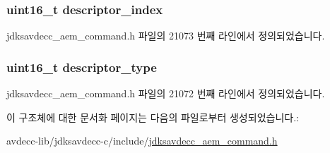 \subsubsection[{\texorpdfstring{descriptor\+\_\+index}{descriptor_index}}]{\setlength{\rightskip}{0pt plus 5cm}uint16\+\_\+t descriptor\+\_\+index}\hypertarget{structjdksavdecc__aem__command__get__mixer__response_a042bbc76d835b82d27c1932431ee38d4}{}\label{structjdksavdecc__aem__command__get__mixer__response_a042bbc76d835b82d27c1932431ee38d4}


jdksavdecc\+\_\+aem\+\_\+command.\+h 파일의 21073 번째 라인에서 정의되었습니다.

\subsubsection[{\texorpdfstring{descriptor\+\_\+type}{descriptor_type}}]{\setlength{\rightskip}{0pt plus 5cm}uint16\+\_\+t descriptor\+\_\+type}\hypertarget{structjdksavdecc__aem__command__get__mixer__response_ab7c32b6c7131c13d4ea3b7ee2f09b78d}{}\label{structjdksavdecc__aem__command__get__mixer__response_ab7c32b6c7131c13d4ea3b7ee2f09b78d}


jdksavdecc\+\_\+aem\+\_\+command.\+h 파일의 21072 번째 라인에서 정의되었습니다.



이 구조체에 대한 문서화 페이지는 다음의 파일로부터 생성되었습니다.\+:\begin{DoxyCompactItemize}
\item 
avdecc-\/lib/jdksavdecc-\/c/include/\hyperlink{jdksavdecc__aem__command_8h}{jdksavdecc\+\_\+aem\+\_\+command.\+h}\end{DoxyCompactItemize}
